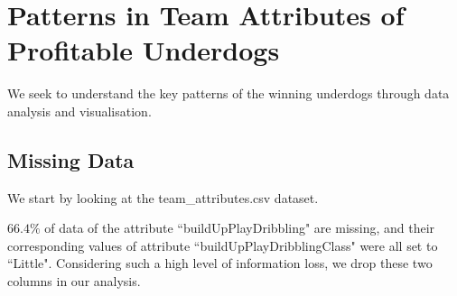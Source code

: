 \documentclass[12pt, a4paper]{article}
\begin{document}
\section{Patterns in Team Attributes of Profitable Underdogs}
We seek to understand the key patterns of the winning underdogs through data analysis and visualisation. 
\subsection{Missing Data}
We start by looking at the team\_attributes.csv dataset.

$66.4\%$ of data of the attribute ``buildUpPlayDribbling" are missing, and their corresponding values of attribute ``buildUpPlayDribblingClass" were all set to ``Little". Considering such a high level of information loss, we drop these two columns in our analysis.
\end{document}
